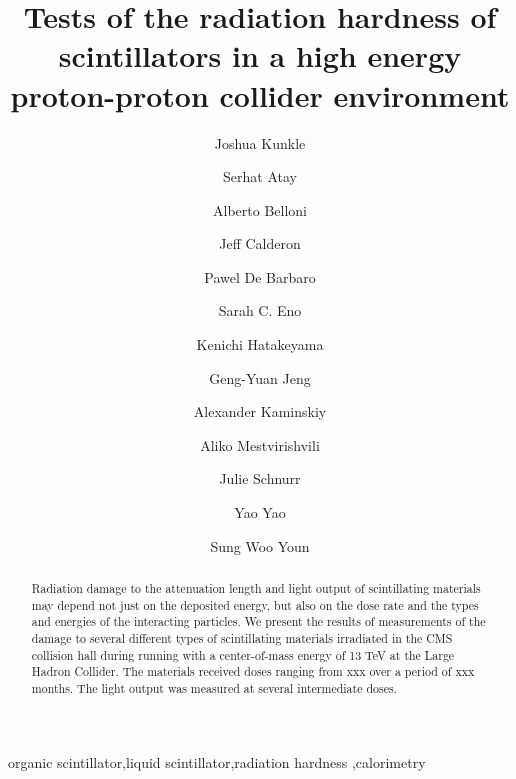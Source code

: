 \documentclass[review]{elsarticle}
\begin{document}
\begin{frontmatter}

\title{Tests of the radiation hardness of scintillators in a high energy proton-proton collider environment }


\author[umd]{Joshua Kunkle}
\author[istanbul]{Serhat Atay}
\author[umd]{Alberto Belloni}
\author[umd]{Jeff Calderon}
\author[rochester]{Pawel De Barbaro}
\author[umd]{Sarah C. Eno}
\author[baylor]{Kenichi Hatakeyama}
\author[umd]{Geng-Yuan Jeng}
\author[moscow]{Alexander Kaminskiy}
\author[rochester]{Aliko Mestvirishvili}
\author[umd]{Julie Schnurr}
\author[umd]{Yao Yao}
\author[korea]{Sung Woo Youn}


\address[umd]{Dept. Physics, U. Maryland, College Park MD 30742 USA}
\address[korea]{Institute for Basic Science, Center for Axion and Precision Physics Research, IBS Center for Axion and Precision Physics Research
Room 4315, Department of Physics, Natural Science Building (E6-2), KAIST,
291 Daehak-ro, Yuseong-gu, Daejeon 305-701, South Korea}
\address[fnal]{Fermi National Accelerator Laboratory, Batavia, IL, USA}
\address[baylor]{Baylor University, Waco, Texas, USA}
\address[iowa]{The University of Iowa, Iowa City, IA, USA}
\address[rochester]{The University of Rochester, Rochester, NY, USA}
\address[moscow]{Skobelsyn Institute of Nuclear Physics, Lomonosov Moscow, Russia}
\address[istanbul]{Istanbul Technical University, Istanbul, Turkey}

\begin{abstract}
  Radiation damage to the attenuation length and light output
  of scintillating materials may depend not just on the deposited energy, but also on the dose rate and the types and energies of the interacting particles.
  We present the
  results of measurements of the damage to several different types
  of scintillating materials irradiated in the CMS collision hall
  during running with a center-of-mass energy of 13 TeV at the Large Hadron Collider.  The materials received doses ranging from {\color{red} xxx} over a period of {\color{red} xxx} months.  The light output was measured at several intermediate doses.
\end{abstract}

\begin{keyword}
organic scintillator\sep liquid scintillator\sep radiation
hardness \sep calorimetry
\end{keyword}

\end{frontmatter}
\end{document}
